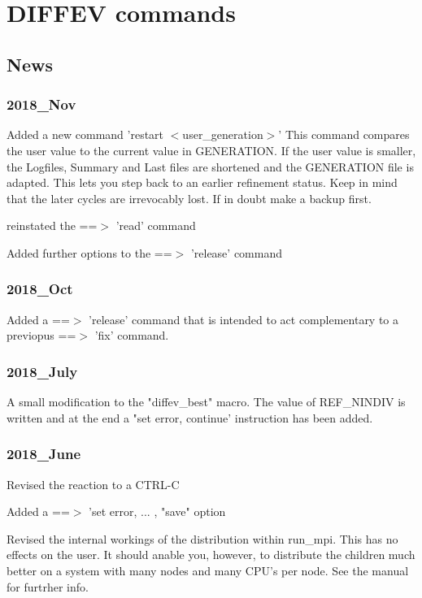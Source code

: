 \chapter{DIFFEV commands}
\section{News}
\subsection*{2018\_Nov}
\par
Added a new command 'restart $ <$user\_generation$> $' This command compares 
the user value to the current value in GENERATION. If the user 
value is smaller, the Logfiles, Summary and Last files are 
shortened and the GENERATION file is adapted. This lets you step 
back to an earlier refinement status. Keep in mind that the later 
cycles are irrevocably lost. If in doubt make a backup first. 
\par
reinstated the ==$> $ 'read' command 
\par
Added further options to the ==$> $ 'release' command 
\subsection*{2018\_Oct}
\par
Added a ==$> $ 'release' command that is intended to act 
complementary to a previopus ==$> $ 'fix' command. 
\subsection*{2018\_July}
\par
A small modification to the "diffev\_best" macro. 
The value of REF\_NINDIV is written and at the end a 
"set error, continue' instruction has been added. 
\subsection*{2018\_June}
\par
Revised the reaction to a CTRL-C 
\par
Added a ==$> $ 'set error, ... , "save" option 
\par
Revised the internal workings of the distribution within 
run\_mpi. This has no effects on the user. It should anable you, 
however, to distribute the children much better on a system with 
many nodes and many CPU's per node. See the manual for furtrher info. 
